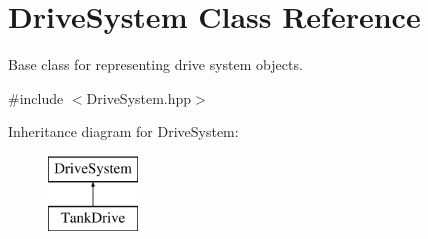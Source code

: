 \hypertarget{classDriveSystem}{\section{Drive\-System Class Reference}
\label{classDriveSystem}
}


Base class for representing drive system objects.  




{\ttfamily \#include $<$Drive\-System.\-hpp$>$}

Inheritance diagram for Drive\-System\-:\begin{figure}[H]
\begin{center}
\leavevmode
\includegraphics[height=2.000000cm]{classDriveSystem}
\end{center}
\end{figure}
